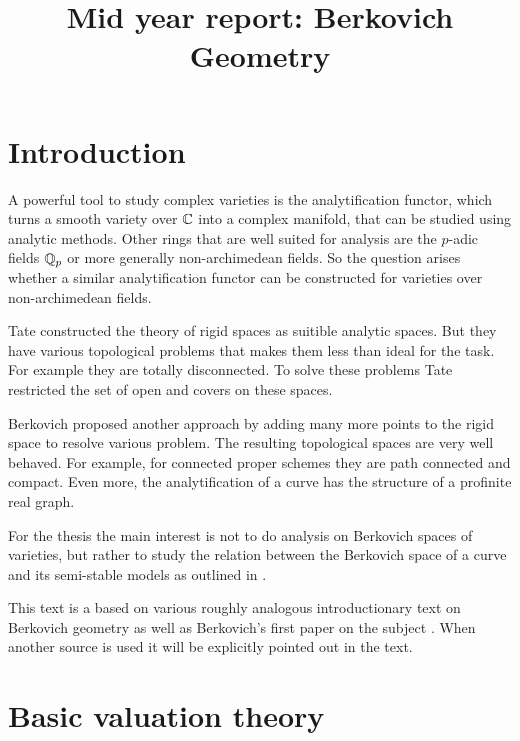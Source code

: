 \documentclass[a4paper]{article}
\title{Mid year report: Berkovich Geometry}
\begin{document}
\maketitle

\listoftodos

\pagebreak

\tableofcontents

\pagebreak


\section{Introduction} \label{sec:introduction}

A powerful tool to study complex varieties is the analytification functor, which turns a  smooth variety over $\mathbb{C}$ into a complex manifold, that can be studied using analytic methods. 
Other rings that are well suited for analysis are the $p$-adic fields $\mathbb{Q}_p$ or more generally non-archimedean fields. 
So the question arises whether a similar analytification functor can be constructed for  varieties over non-archimedean fields. 

Tate constructed the theory of rigid spaces as suitible analytic spaces. 
But they have various topological problems that makes them less than ideal for the task. 
For example they are totally disconnected. To solve these problems Tate restricted the set of open and covers on these spaces. 

Berkovich proposed another approach by adding many more points to the rigid space to resolve various problem. 
The resulting topological spaces are very well behaved. 
For example, for connected proper schemes they are path connected and compact. 
Even more, the analytification of a curve has the structure of a profinite real graph. 

For the thesis the main interest is not to do analysis on Berkovich spaces of varieties, but rather to study the relation between the Berkovich space of a curve and its semi-stable models as outlined in \cite{bakerStructureNonarchimedeanAnalytic2013}.

This text is a based on various roughly analogous introductionary text on Berkovich geometry \cite{bakerarizona,temkinIntroductionBerkovichAnalytic2010,nicaiseNONARCHIMEDEANGEOMETRY,boschLecturesFormalRigid2014} as well as Berkovich's first paper on the subject \cite{berkovichSpectralTheoryAnalytic2012}.
When another source is used it will be explicitly pointed out in the text. 

\section{Basic valuation theory} \label{sec:basic_valuation_theory}
\end{document}
